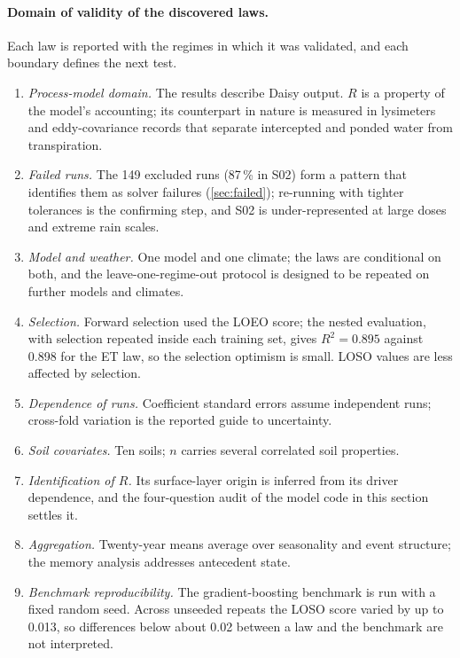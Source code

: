 \paragraph{Domain of validity of the discovered laws.}
Each law is reported with the regimes in which it was validated, and each boundary defines the next test.
\begin{enumerate}[nosep]
\item \emph{Process-model domain.} The results describe Daisy output. $R$ is a property of the model's accounting; its counterpart in nature is measured in lysimeters and eddy-covariance records that separate intercepted and ponded water from transpiration.
\item \emph{Failed runs.} The 149 excluded runs (87\,\% in S02) form a pattern that identifies them as solver failures (\cref{sec:failed}); re-running with tighter tolerances is the confirming step, and S02 is under-represented at large doses and extreme rain scales.
\item \emph{Model and weather.} One model and one climate; the laws are conditional on both, and the leave-one-regime-out protocol is designed to be repeated on further models and climates.
\item \emph{Selection.} Forward selection used the LOEO score; the nested evaluation, with selection repeated inside each training set, gives $R^2=0.895$ against 0.898 for the ET law, so the selection optimism is small. LOSO values are less affected by selection.
\item \emph{Dependence of runs.} Coefficient standard errors assume independent runs; cross-fold variation is the reported guide to uncertainty.
\item \emph{Soil covariates.} Ten soils; $n$ carries several correlated soil properties.
\item \emph{Identification of $R$.} Its surface-layer origin is inferred from its driver dependence, and the four-question audit of the model code in this section settles it.
\item \emph{Aggregation.} Twenty-year means average over seasonality and event structure; the memory analysis addresses antecedent state.
\item \emph{Benchmark reproducibility.} The gradient-boosting benchmark is run with a fixed random seed. Across unseeded repeats the LOSO score varied by up to 0.013, so differences below about 0.02 between a law and the benchmark are not interpreted.
\end{enumerate}

